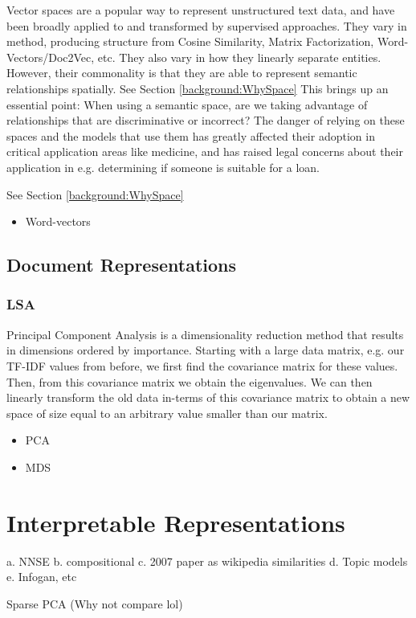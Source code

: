 Vector spaces are a popular way to represent unstructured text data, and have been broadly applied to and transformed by supervised approaches. They vary in method, producing structure from Cosine Similarity, Matrix Factorization, Word-Vectors/Doc2Vec, etc. %
They also vary in how they linearly separate entities. %
However, their commonality is that they are able to represent semantic relationships spatially. %
See Section \ref{background:WhySpace}
This brings up an essential point: When using a semantic space, are we taking advantage of relationships that are discriminative or incorrect? The danger of relying on these spaces and the models that use them has greatly affected their adoption in critical application areas like medicine, %
and has raised legal concerns about their application in e.g. determining if someone is suitable for a loan. 

See Section \ref{background:WhySpace}\begin{itemize}
	\item Word-vectors
\end{itemize}
\subsection{Document Representations}
\subsubsection{LSA}
Principal Component Analysis is a dimensionality reduction method that results in dimensions ordered by importance. Starting with a large data matrix, e.g. our TF-IDF values from before, we first find the covariance matrix for these values. Then, from this covariance matrix we obtain the eigenvalues. We can then linearly transform the old data in-terms of this covariance matrix to obtain a new space of size equal to an arbitrary value smaller than our matrix.
\begin{itemize}
	\item PCA %
	\item MDS
\end{itemize}
\section{Interpretable Representations}
a. NNSE
b. compositional
c. 2007 paper as wikipedia similarities
d. Topic models
e. Infogan, etc

\cite{Zhang2012} Sparse PCA (Why not compare lol)

